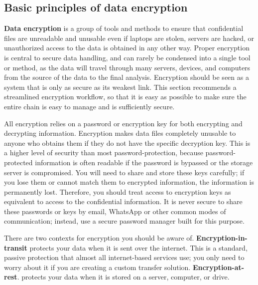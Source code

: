 \subsection{Basic principles of data encryption}

\textbf{Data encryption} is a group of tools and methods
to ensure that confidential files are unreadable and unusable
even if laptops are stolen, servers are hacked,
or unauthorized access to the data is obtained in any other way.
Proper encryption is central to secure data handling,
and can rarely be condensed into a single tool or method,
as the data will travel through many servers, devices, and computers
from the source of the data to the final analysis.
Encryption should be seen as a system
that is only as secure as its weakest link.
This section recommends a streamlined encryption workflow,
so that it is easy as possible to make sure
the entire chain is easy to manage and is sufficiently secure.

All encryption relies on a password or encryption key
for both encrypting and decrypting information.
Encryption makes data files completely unusable
to anyone who obtains them if they do not have the specific decryption key.
This is a higher level of security than most password-protection,
because password-protected information is often readable
if the password is bypassed or the storage server is compromised.
You will need to share and store these keys carefully;
if you lose them or cannot match them to encrypted information,
the information is permanently lost.
Therefore, you should treat access to encryption keys
as equivalent to access to the confidential information.
It is never secure to share these passwords or keys by email,
WhatsApp or other common modes of communication;
instead, use a secure password manager built for this purpose.

There are two contexts for encryption you should be aware of.
\textbf{Encryption-in-transit}
protects your data when it is sent over the internet.
This is a standard, passive protection that almost all internet-based services use;
you only need to worry about it if you are creating a custom transfer solution.
\textbf{Encryption-at-rest}.
protects your data when it is stored on a server, computer, or drive.

